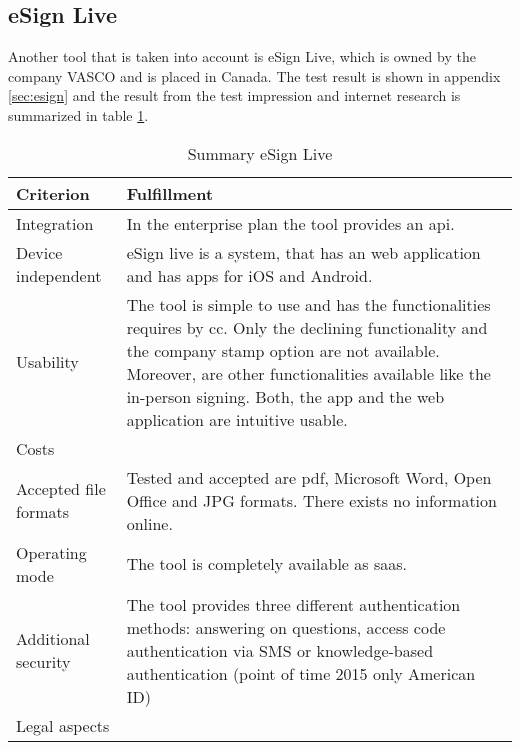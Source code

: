 \subsection{eSign Live}
Another tool that is taken into account is eSign Live, which is owned by the company VASCO and is placed in Canada. The test result is shown in appendix \ref{sec:esign} and the result from the test impression and internet research is summarized in table \ref{tab:esign}.
\begin{table}[h!]
	\begin{tabular}{|p{4cm}|p{10cm}|} \hline
		Criterion & Fulfillment \\ \hline
		Integration & In the enterprise plan the tool provides an \gls{api}. \parencite{esign2018info} \\ \hline
		Device independent & eSign live is a system, that has an web application and has \glspl{app} for iOS and Android. \parencite{esign2018info} \\ \hline
		Usability & The tool is simple to use and has the functionalities requires by \gls{cc}. Only the declining functionality and the company stamp option are not available. Moreover, are other functionalities available like the in-person signing. Both, the \gls{app} and the web application are intuitive usable.  \\ \hline
		Costs & \\ \hline
		Accepted file formats & Tested and accepted are \gls{pdf}, Microsoft Word, Open Office and JPG formats. There exists no information online.\\ \hline
		Operating mode & The tool is completely available as \gls{saas}.\\ \hline
		Additional security & The tool provides three different authentication methods: answering on questions, access code authentication via SMS or knowledge-based authentication (point of time 2015 only American ID) \parencite{esign2018security} \\ \hline
		Legal aspects & \\ \hline
	\end{tabular}
	\caption{Summary eSign Live}
	\label{tab:esign}
\end{table}

